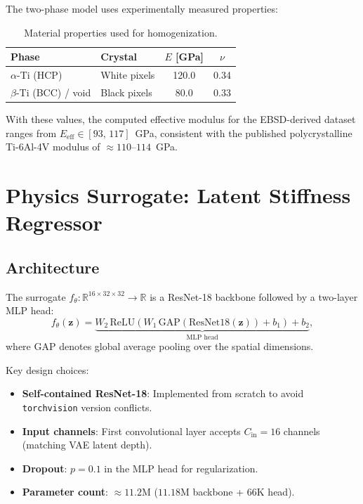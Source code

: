 \documentclass[12pt,a4paper]{article}
\newcommand{\R}{\mathbb{R}}
\newcommand{\Eeff}{E_{\mathrm{eff}}}
\newcommand{\zvec}{\bm{z}}
\theoremstyle{definition}
\begin{document}
The two-phase model uses experimentally measured properties:
\begin{table}[h]
  \centering
  \caption{Material properties used for homogenization.}
  \label{tab:material}
  \begin{tabular}{llcc}
    \toprule
    Phase & Crystal & $E$ [GPa] & $\nu$ \\
    \midrule
    $\alpha$-Ti (HCP) & White pixels & 120.0 & 0.34 \\
    $\beta$-Ti (BCC) / void & Black pixels & 80.0 & 0.33 \\
    \bottomrule
  \end{tabular}
\end{table}

With these values, the computed effective modulus for the EBSD-derived dataset
ranges from $\Eeff \in [93,\, 117]$~GPa, consistent with the published
polycrystalline Ti-6Al-4V modulus of $\approx 110$--$114$~GPa.

\section{Physics Surrogate: Latent Stiffness Regressor}
\label{sec:surrogate}

\subsection{Architecture}

The surrogate $f_\theta : \R^{16 \times 32 \times 32} \to \R$ is a
ResNet-18 backbone followed by a two-layer MLP head:
\begin{equation}
  f_\theta(\zvec) = \underbrace{W_2\, \mathrm{ReLU}(W_1\, \mathrm{GAP}(\mathrm{ResNet18}(\zvec)) + b_1) + b_2}_{\text{MLP head}},
\end{equation}
where $\mathrm{GAP}$ denotes global average pooling over the spatial
dimensions.

Key design choices:
\begin{itemize}[nosep]
  \item \textbf{Self-contained ResNet-18}: Implemented from scratch to avoid \texttt{torchvision} version conflicts.
  \item \textbf{Input channels}: First convolutional layer accepts $C_{\mathrm{in}}=16$ channels (matching VAE latent depth).
  \item \textbf{Dropout}: $p=0.1$ in the MLP head for regularization.
  \item \textbf{Parameter count}: $\approx 11.2$M ($11.18$M backbone + $66$K head).
\end{itemize}
\end{document}
